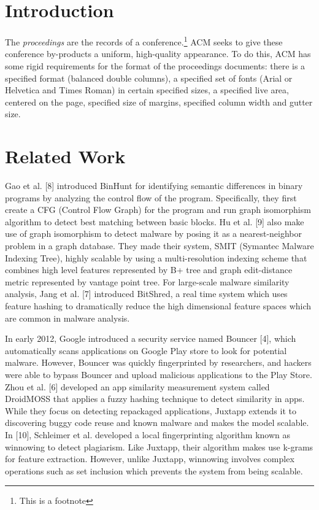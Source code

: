 \section{Introduction}

The \textit{proceedings} are the records of a conference.\footnote{This
  is a footnote}  ACM seeks
to give these conference by-products a uniform, high-quality
appearance.  To do this, ACM has some rigid requirements for the
format of the proceedings documents: there is a specified format
(balanced double columns), a specified set of fonts (Arial or
Helvetica and Times Roman) in certain specified sizes, a specified
live area, centered on the page, specified size of margins, specified
column width and gutter size.

\section{Related Work}

Gao et al. [8] introduced BinHunt for identifying semantic differences in binary programs by analyzing the control flow of the program. Specifically, they first create a CFG (Control Flow Graph) for the program and run graph isomorphism algorithm to detect best matching between basic blocks. Hu et al. [9]  also make use of graph isomorphism to detect malware by posing it as a nearest-neighbor problem in a graph database. They made their system, SMIT (Symantec Malware Indexing Tree), highly scalable by using a multi-resolution indexing scheme that combines high level features represented by B+ tree and graph edit-distance metric represented by vantage point tree. For large-scale malware similarity analysis, Jang et al. [7] introduced BitShred, a real time system which uses feature hashing to dramatically reduce the high dimensional feature spaces which are common in malware analysis.
 
In early 2012, Google introduced a security service named Bouncer [4], which automatically scans applications on Google Play store to look for potential malware. However, Bouncer was quickly fingerprinted by researchers, and hackers were able to bypass Bouncer and upload malicious applications to the Play Store. Zhou et al. [6] developed an app similarity measurement system called DroidMOSS that applies a fuzzy hashing technique to detect similarity in apps. While they focus on detecting repackaged applications, Juxtapp extends it to discovering buggy code reuse and known malware and makes the model scalable. In [10], Schleimer et al. developed a local fingerprinting algorithm known as winnowing to detect plagiarism. Like Juxtapp, their algorithm makes use k-grams for feature extraction. However, unlike Juxtapp, winnowing involves complex operations such as set inclusion which prevents the system from being scalable.
 
